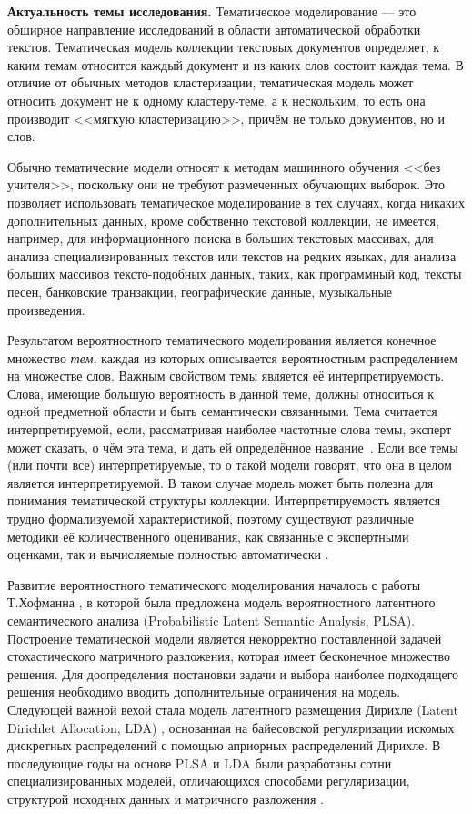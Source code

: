 
\textbf{Актуальность темы исследования.} 
Тематическое моделирование --- это обширное направление исследований в области автоматической обработки текстов. Тематическая модель коллекции текстовых документов определяет, к каким темам относится каждый документ и из каких слов состоит каждая тема. В отличие от обычных методов кластеризации, тематическая модель может относить документ не к одному кластеру-теме, а к нескольким, то есть  она производит <<мягкую кластеризацию>>, причём не только документов, но и слов. 

Обычно тематические модели относят к методам машинного обучения <<без учителя>>, поскольку они не требуют размеченных обучающих выборок. Это позволяет использовать тематическое моделирование в тех случаях, когда никаких дополнительных данных, кроме собственно текстовой коллекции, не имеется, например, для информационного поиска в больших текстовых массивах, для анализа специализированных текстов или текстов на редких языках, для анализа больших массивов тексто-подобных данных, таких, как программный код, тексты песен, банковские транзакции, географические данные, музыкальные произведения.

Результатом вероятностного тематического моделирования является конечное множество \textit{тем}, каждая из которых описывается вероятностным распределением на множестве слов. Важным свойством темы является её интерпретируемость. Слова, имеющие большую вероятность в данной теме, должны относиться к одной предметной области и быть семантически связанными. Тема считается интерпретируемой, если, рассматривая наиболее частотные слова темы, эксперт может сказать, о чём эта тема, и дать ей определённое название~\cite{rtl}. Если все темы (или почти все) интерпретируемые, то о такой модели говорят, что она в целом является интерпретируемой. В таком случае модель может быть полезна для понимания тематической структуры коллекции. Интерпретируемость является трудно формализуемой характеристикой, поэтому существуют различные методики её количественного оценивания, как связанные с экспертными оценками, так и вычисляемые полностью автоматически \cite{newman2010automatic}.  

Развитие вероятностного тематического моделирования началось с работы Т.Хофманна \cite{hofmann1999}, в которой была предложена модель вероятностного латентного семантического анализа (Probabilistic Latent Semantic Analysis, PLSA). Построение тематической модели является некорректно поставленной задачей стохастического матричного разложения, которая имеет бесконечное множество решения. Для доопределения постановки задачи и выбора наиболее подходящего решения необходимо вводить дополнительные ограничения на модель. Следующей важной вехой стала модель латентного размещения Дирихле (Latent Dirichlet Allocation, LDA) \cite{blei2003latent}, основанная на байесовской регуляризации искомых дискретных распределений с помощью априорных распределений Дирихле. В последующие годы на основе PLSA и LDA были разработаны сотни специализированных моделей, отличающихся способами регуляризации, структурой исходных данных и матричного разложения \cite{daud10knowledge,blei2012,fntir2017applications}. 

